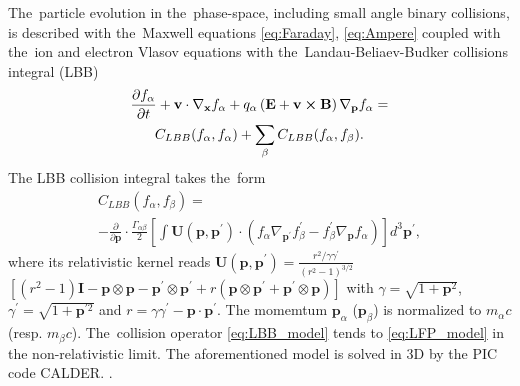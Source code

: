 The~particle evolution in the~phase-space, including small angle 
binary collisions, is described with 
the~Maxwell equations \eqref{eq:Faraday}, \eqref{eq:Ampere}
coupled with the~ion and electron Vlasov equations with 
the~Landau-Beliaev-Budker collisions integral (LBB)
\cite{Landau_1936, Beliaev_SPD1956} 
\begin{multline}
\frac{\partial f_\alpha}{\partial t}+\mathbf{v}\cdot\nabla_{\mathbf{x}}f_\alpha+q_\alpha\left(\mathbf{E}+\mathbf{v}\boldsymbol{\times}\mathbf{B}\right)\nabla_{\mathbf{p}}f_\alpha =
\\
C_{LBB}(f_\alpha,f_\alpha)+\sum_\beta C_{LBB}(f_\alpha,f_\beta)
.
\end{multline}
The LBB collision integral takes the~form
\begin{multline}
C_{LBB}(f_\alpha,f_\beta)=
\\
-\frac{\partial}{\partial \mathbf{p}}\cdot\frac{\Gamma_{\alpha\beta}}{2}\left[\int \mathbf{U}(\mathbf{p},\mathbf{p}^\prime)\cdot(f_\alpha\nabla_{\mathbf{p}^\prime}f_\beta^\prime-f_\beta^\prime\nabla_{\mathbf{p}}f_\alpha)\right]d^3\mathbf{p}^\prime
,
\label{eq:LBB_model}
\end{multline}
where its relativistic kernel reads
$\mathbf{U}(\mathbf{p},\mathbf{p}^\prime)=\frac{r^2/\gamma\gamma^\prime}{(r^2-1)^{3/2}}$ 
$\left[(r^2-1)\mathbf{I}-\mathbf{p}\otimes\mathbf{p}-\mathbf{p}^\prime\otimes\mathbf{p}^\prime+r(\mathbf{p}\otimes\mathbf{p}^\prime+\mathbf{p}^\prime\otimes\mathbf{p})\right]$
with $\gamma=\sqrt{1+\mathbf{p}^2}$, $\gamma^\prime=\sqrt{1+\mathbf{p}^{\prime 2}}$ and $r=\gamma\gamma^\prime-\mathbf{p}\cdot\mathbf{p}^\prime$. 
The momemtum $\mathbf{p}_\alpha$ ($\mathbf{p}_\beta$) is normalized to 
$m_\alpha c$ (resp. $m_\beta c$). The~collision operator \eqref{eq:LBB_model} 
tends to \eqref{eq:LFP_model} in the non-relativistic limit.
The aforementioned model is solved in 3D by the PIC code CALDER. 
\cite{Lefebvre_NF2003, Perez_PoP2012}.

